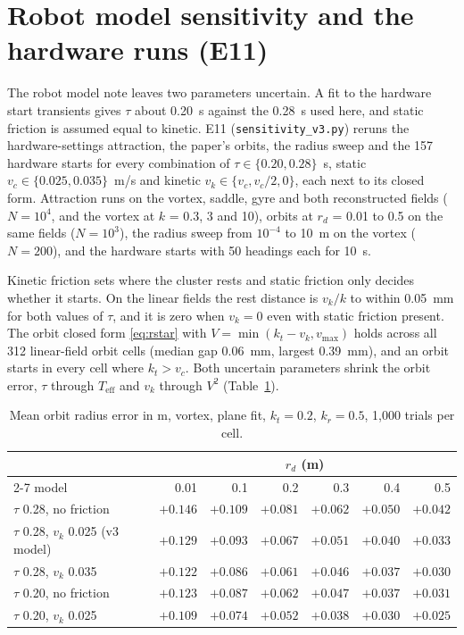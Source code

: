 \documentclass[10pt,letterpaper]{article}
\newcommand{\Teff}{T_{\mathrm{eff}}}
\newcommand{\vmax}{v_{\max}}
\begin{document}
\section{Robot model sensitivity and the hardware runs (E11)}\label{sec:e11}

The robot model note leaves two parameters uncertain. A fit to the hardware start transients gives $\tau$ about 0.20~s against the 0.28~s used here, and static friction is assumed equal to kinetic. E11 (\texttt{sensitivity\_v3.py}) reruns the hardware-settings attraction, the paper's orbits, the radius sweep and the 157 hardware starts for every combination of $\tau \in \{0.20, 0.28\}$~s, static $v_c \in \{0.025, 0.035\}$~m/s and kinetic $v_k \in \{v_c, v_c/2, 0\}$, each next to its closed form. Attraction runs on the vortex, saddle, gyre and both reconstructed fields ($N = 10^4$, and the vortex at $k$ = 0.3, 3 and 10), orbits at $r_d$ = 0.01 to 0.5 on the same fields ($N = 10^3$), the radius sweep from $10^{-4}$ to 10~m on the vortex ($N = 200$), and the hardware starts with 50 headings each for 10~s.

Kinetic friction sets where the cluster rests and static friction only decides whether it starts. On the linear fields the rest distance is $v_k/k$ to within 0.05~mm for both values of $\tau$, and it is zero when $v_k = 0$ even with static friction present. The orbit closed form \eqref{eq:rstar} with $V = \min(k_t - v_k, \vmax)$ holds across all 312 linear-field orbit cells (median gap 0.06~mm, largest 0.39~mm), and an orbit starts in every cell where $k_t > v_c$. Both uncertain parameters shrink the orbit error, $\tau$ through $\Teff$ and $v_k$ through $V^2$ (Table~\ref{tab:e11orbit}).

\begin{table}[htbp]
\centering\small
\caption{Mean orbit radius error in m, vortex, plane fit, $k_t = 0.2$, $k_r = 0.5$, 1,000 trials per cell.}
\label{tab:e11orbit}
\begin{tabular}{@{}l rrrrrr@{}}
\toprule
 & \multicolumn{6}{c}{$r_d$ (m)} \\
\cmidrule(l){2-7}
model & 0.01 & 0.1 & 0.2 & 0.3 & 0.4 & 0.5 \\
\midrule
$\tau$ 0.28, no friction & $+0.146$ & $+0.109$ & $+0.081$ & $+0.062$ & $+0.050$ & $+0.042$ \\
$\tau$ 0.28, $v_k$ 0.025 (v3 model) & $+0.129$ & $+0.093$ & $+0.067$ & $+0.051$ & $+0.040$ & $+0.033$ \\
$\tau$ 0.28, $v_k$ 0.035 & $+0.122$ & $+0.086$ & $+0.061$ & $+0.046$ & $+0.037$ & $+0.030$ \\
$\tau$ 0.20, no friction & $+0.123$ & $+0.087$ & $+0.062$ & $+0.047$ & $+0.037$ & $+0.031$ \\
$\tau$ 0.20, $v_k$ 0.025 & $+0.109$ & $+0.074$ & $+0.052$ & $+0.038$ & $+0.030$ & $+0.025$ \\
\bottomrule
\end{tabular}
\end{table}
\end{document}

